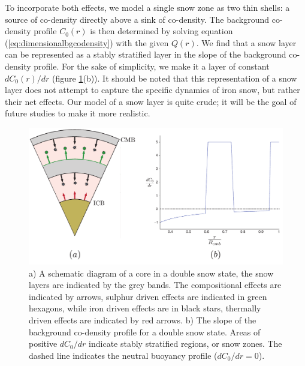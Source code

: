 To incorporate both effects, we model a single snow zone as two thin shells: a source of co-density directly above a sink of co-density. The background co-density profile $C_{0}\left(r\right)$ is then determined by solving equation (\ref{eq:dimensionalbgcodensity}) with the given $Q\left(r\right)$. We find that a snow layer can be represented as a stably stratified layer in the slope of the background co-density profile. For the sake of simplicity, we make it a layer of constant $d C_{0}\left(r\right)/dr$ (figure \ref{fig:setup}(b)). It should be noted that this representation of a snow layer does not attempt to capture the specific dynamics of iron snow, but rather their net effects. Our model of a snow layer is quite crude; it will be the goal of future studies to make it more realistic.
\begin{figure}
	\centering
	\noindent\includegraphics[width=40pc]{Chapter4/figures/setup.pdf}
	\caption{a) A schematic diagram of a core in a double snow state, the snow layers are indicated by the grey bands. The compositional effects are indicated by arrows, sulphur driven effects are indicated in green hexagons, while iron driven effects are in black stars, thermally driven effects are indicated by red arrows. b) The slope of the background co-density profile for a double snow state. Areas of positive $dC_{0}/dr$ indicate stably stratified regions, or snow zones. The dashed line indicates the neutral buoyancy profile ($dC_{0}/dr=0$).}
	\label{fig:setup}
\end{figure}

